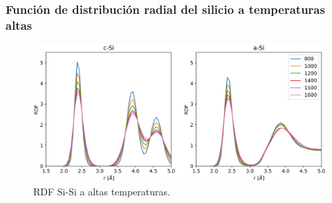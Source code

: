 \subsubsection{Función de distribución radial del silicio a temperaturas altas}

\begin{figure}[h!]
    \centering
    \includegraphics[width=\textwidth]{Silicio/comportamiento/resultados/traza/rdf/rdf.png}
    \caption{RDF Si-Si a altas temperaturas.}
    \label{fig:trdf}
\end{figure}
